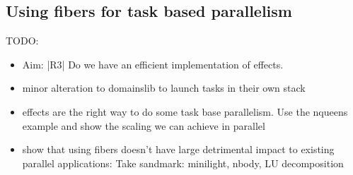 \documentclass[sigplan,10pt,review,anonymous]{acmart}\settopmatter{printfolios=true,printccs=false,printacmref=false}
\begin{document}
\subsection{Using fibers for task based parallelism}

TODO:
\begin{itemize}
\item Aim: |R3| Do we have an efficient implementation of effects.
\item minor alteration to domainslib to launch tasks in their own stack
\item effects are the right way to do some task base parallelism. Use the nqueens example and show the scaling we can achieve in parallel
\item show that using fibers doesn't have large detrimental impact to existing parallel applications: Take sandmark: minilight, nbody, LU decomposition
\end{itemize}
\end{document}
